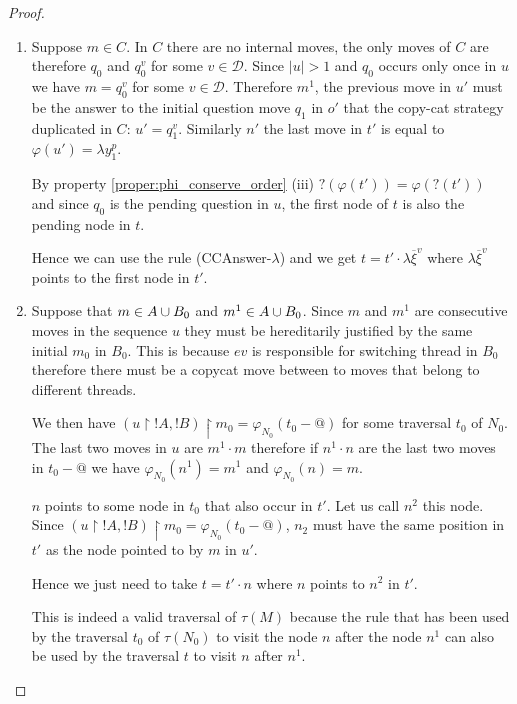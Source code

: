 \begin{proof}
\begin{itemize}
    \begin{enumerate}
    \item Suppose $m \in C$. In $C$ there are no internal moves, the only moves of $C$ are therefore $q_0$ and
    $q_0^v$ for some $v\in\mathcal{D}$. Since $|u|>1$ and $q_0$ occurs only once in $u$ we have $m = q_0^v$
    for some $v\in \mathcal{D}$.  Therefore $m^1$, the previous move in $u'$ must be the answer to the initial question move
    $q_1$ in $o'$ that the copy-cat strategy duplicated in $C$: $u'=q_1^v$. Similarly $n'$ the last move in $t'$ is equal to
    $\varphi(u') = \lambda y_1^p$.

    By property \ref{proper:phi_conserve_order} (iii) $?(\varphi(t')) = \varphi(?(t'))$ and
    since $q_0$ is the pending question in $u$,
    the first node of $t$ is also the pending node in $t$.

    Hence we can use the rule (CCAnswer-$\lambda$) and we get $t = t' \cdot \lambda \overline{\xi}^v$
    where $\lambda \overline{\xi}^v$ points to the first node in $t'$.

    \item Suppose that $m \in A \cup B_0$ and $m^1 \in A \cup B_0$.
    Since $m$ and $m^1$ are consecutive moves in the sequence $u$ they must be hereditarily justified by the same initial
    $m_0$ in $B_0$. This is because $ev$ is responsible for switching thread in $B_0$ therefore there must be a copycat
    move between to moves that belong to different threads.

    We then have $(u \upharpoonright !A, !B)\upharpoonright m_0 = \varphi_{N_0}(t_0-@)$ for some traversal $t_0$ of $N_0$.
    The last two moves in $u$ are $m^1 \cdot m$ therefore
    if $n^1 \cdot n$ are the last two moves in $t_0-@$ we have
    $\varphi_{N_0}(n^1) = m^1$ and $\varphi_{N_0}(n) = m$.

    $n$ points to some node in $t_0$ that also occur in $t'$. Let us call $n^2$ this node.
    Since $(u \upharpoonright !A, !B)\upharpoonright m_0 = \varphi_{N_0}(t_0-@)$,
    $n_2$ must have the same position in $t'$ as the node pointed to by $m$ in $u'$.

    Hence we just need to take $t = t' \cdot n$ where $n$ points to $n^2$ in $t'$.

    This is indeed a valid traversal of $\tau(M)$
    because the rule that has been used by the traversal $t_0$
    of $\tau(N_0)$ to visit the node $n$ after the node $n^1$ can also be used by the traversal $t$ to visit $n$ after $n^1$.


\end{enumerate}
\end{itemize}
\end{proof}
